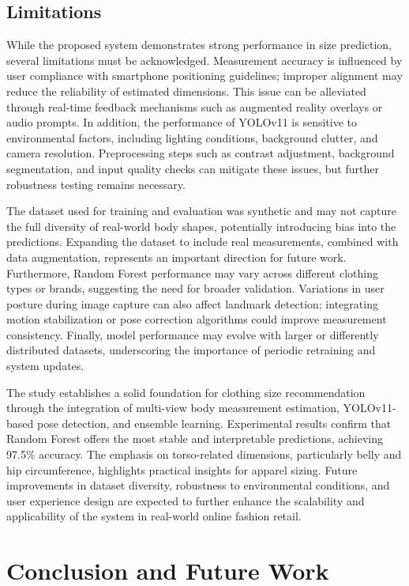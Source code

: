 \documentclass{llncs}
\begin{document}
\subsection{Limitations}
While the proposed system demonstrates strong performance in size prediction, several limitations must be acknowledged.
Measurement accuracy is influenced by user compliance with smartphone positioning guidelines; improper alignment may reduce the reliability of estimated dimensions. 
This issue can be alleviated through real-time feedback mechanisms such as augmented reality overlays or audio prompts. 
In addition, the performance of YOLOv11 is sensitive to environmental factors, including lighting conditions, background clutter, and camera resolution. 
Preprocessing steps such as contrast adjustment, background segmentation, and input quality checks can mitigate these issues, but further robustness testing remains necessary.

The dataset used for training and evaluation was synthetic and may not capture the full diversity of real-world body shapes, potentially introducing bias into the predictions. 
Expanding the dataset to include real measurements, combined with data augmentation, represents an important direction for future work. 
Furthermore, Random Forest performance may vary across different clothing types or brands, suggesting the need for broader validation. 
Variations in user posture during image capture can also affect landmark detection; integrating motion stabilization or pose correction algorithms could improve measurement consistency. 
Finally, model performance may evolve with larger or differently distributed datasets, underscoring the importance of periodic retraining and system updates.

The study establishes a solid foundation for clothing size recommendation through the integration of multi-view body measurement estimation, YOLOv11-based pose detection, and ensemble learning. 
Experimental results confirm that Random Forest offers the most stable and interpretable predictions, achieving 97.5\% accuracy. 
The emphasis on torso-related dimensions, particularly belly and hip circumference, highlights practical insights for apparel sizing. 
Future improvements in dataset diversity, robustness to environmental conditions, and user experience design are expected to further enhance the scalability and applicability of the system in real-world online fashion retail.


\section{Conclusion and Future Work}
\end{document}
